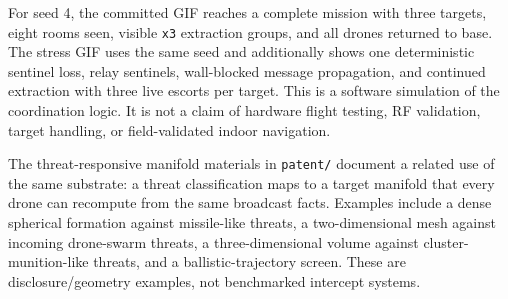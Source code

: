 \begin{Shaded}
\begin{Highlighting}[]
\OperatorTok{=}
\OperatorTok{=}\OperatorTok{=}\DataTypeTok{\textbackslash{}}
   \DataTypeTok{\textbackslash{}}
\OperatorTok{=}\OperatorTok{=}\DataTypeTok{\textbackslash{}}
    \DataTypeTok{\textbackslash{}}
\end{Highlighting}
\end{Shaded}

For seed 4, the committed GIF reaches a complete mission with three
targets, eight rooms seen, visible \texttt{x3} extraction groups, and
all drones returned to base. The stress GIF uses the same seed and
additionally shows one deterministic sentinel loss, relay sentinels,
wall-blocked message propagation, and continued extraction with three
live escorts per target. This is a software simulation of the
coordination logic. It is not a claim of hardware flight testing, RF
validation, target handling, or field-validated indoor navigation.

The threat-responsive manifold materials in \texttt{patent/} document a
related use of the same substrate: a threat classification maps to a
target manifold that every drone can recompute from the same broadcast
facts. Examples include a dense spherical formation against missile-like
threats, a two-dimensional mesh against incoming drone-swarm threats, a
three-dimensional volume against cluster-munition-like threats, and a
ballistic-trajectory screen. These are disclosure/geometry examples, not
benchmarked intercept systems.

